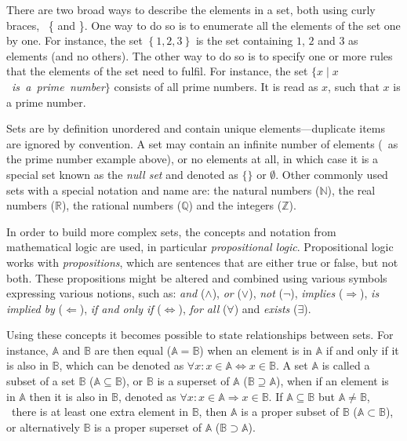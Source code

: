 There are two broad ways to describe the elements in a set, both using curly braces, \ie\ \{ and \}.
One way to do so is to enumerate all the elements of the set one by one.
For instance, the set $\left\{ 1,2,3 \right\}$ is the set containing $1$, $2$ and $3$ as elements (and no others).
The other way to do so is to specify one or more rules that the elements of the set need to fulfil.
For instance, the set $\{ x \mid x$~\emph{is~a~prime~number}$\}$ consists of all prime numbers.
It is read as $x$, such that $x$ is a prime number.

Sets are by definition unordered and contain unique elements---duplicate items are ignored by convention.
A set may contain an infinite number of elements (\eg\ as the prime number example above), or no elements at all, in which case it is a special set known as the \emph{null set} and denoted as $\{ \}$ or $\emptyset$.
Other commonly used sets with a special notation and name are: the natural numbers ($\mathbb{N}$), the real numbers ($\mathbb{R}$), the rational numbers ($\mathbb{Q}$) and the integers ($\mathbb{Z}$).

In order to build more complex sets, the concepts and notation from mathematical logic are used, in particular \emph{propositional logic}.
Propositional logic works with \emph{propositions}, which are sentences that are either true or false, but not both.
These propositions might be altered and combined using various symbols expressing various notions, such as: \emph{and} ($\wedge$), \emph{or} ($\vee$), \emph{not} ($\neg$), \emph{implies} ($\Rightarrow$), \emph{is implied by} ($\Leftarrow$), \emph{if and only if} ($\Leftrightarrow$), \emph{for all} ($\forall$) and \emph{exists} ($\exists$).

Using these concepts it becomes possible to state relationships between sets.
For instance, $\mathbb{A}$ and $\mathbb{B}$ are then equal ($\mathbb{A} = \mathbb{B}$) when an element is in $\mathbb{A}$ if and only if it is also in $\mathbb{B}$, which can be denoted as $\forall x : x \in \mathbb{A} \Leftrightarrow x \in \mathbb{B}$.
A set $\mathbb{A}$ is called a subset of a set $\mathbb{B}$ ($\mathbb{A} \subseteq \mathbb{B}$), or $\mathbb{B}$ is a superset of $\mathbb{A}$ ($\mathbb{B} \supseteq \mathbb{A}$), when if an element is in $\mathbb{A}$ then it is also in $\mathbb{B}$, denoted as $\forall x : x \in \mathbb{A} \Rightarrow x \in \mathbb{B}$.
If $\mathbb{A} \subseteq \mathbb{B}$ but $\mathbb{A} \neq \mathbb{B}$, \ie\ there is at least one extra element in $\mathbb{B}$, then $\mathbb{A}$ is a proper subset of $\mathbb{B}$ ($\mathbb{A} \subset \mathbb{B}$), or alternatively $\mathbb{B}$ is a proper superset of $\mathbb{A}$ ($\mathbb{B} \supset \mathbb{A}$).

